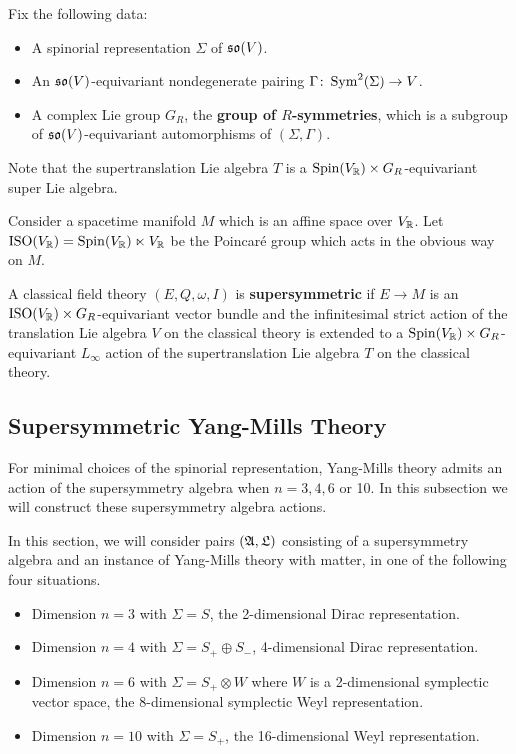 \documentclass[10pt, oneside]{article}
\begin{document}
Fix the following data:
\begin{itemize}
\item A spinorial representation $\Sigma$ of $\mathfrak{so}(V)$.

\item An $\mathfrak{so}(V)$-equivariant nondegenerate pairing $\Gamma\colon \operatorname{Sym}^2(\Sigma)\rightarrow V$.

\item A complex Lie group $G_R$, the {\bf group of $R$-symmetries}, which is a subgroup of $\mathfrak{so}(V)$-equivariant automorphisms of $(\Sigma, \Gamma)$.
\end{itemize}

Note that the supertranslation Lie algebra $T$ is a $\mathrm{Spin}(V_\mathbb R)\times G_R$-equivariant super Lie algebra.

Consider a spacetime manifold $M$ which is an affine space over $V_\mathbb R$. Let $\mathrm{ISO}(V_\mathbb R) = \mathrm{Spin}(V_\mathbb R)\ltimes V_\mathbb R$ be the Poincar\'{e} group which acts in the obvious way on $M$.

\begin{dfn}
A classical field theory $(E, Q, \omega, I)$ is {\bf supersymmetric} if $E\rightarrow M$ is an $\mathrm{ISO}(V_\mathbb R)\times G_R$-equivariant vector bundle and the infinitesimal strict action of the translation Lie algebra $V$ on the classical theory is extended to a $\mathrm{Spin}(V_\mathbb R)\times G_R$-equivariant $L_\infty$ action of the supertranslation Lie algebra $T$ on the classical theory.
\end{dfn}

\subsection{Supersymmetric Yang-Mills Theory} \label{SUSY_action_section}
For minimal choices of the spinorial representation, Yang-Mills theory admits an action of the supersymmetry algebra when $n=3,4,6$ or 10.  In this subsection we will construct these supersymmetry algebra actions.  

In this section, we will consider pairs $(\mathfrak{A}, \mathfrak L)$ consisting of a supersymmetry algebra and an instance of Yang-Mills theory with matter, in one of the following four situations.
\begin{itemize}
 \item Dimension $n=3$ with $\Sigma = S$, the 2-dimensional Dirac representation.
 \item Dimension $n=4$ with $\Sigma = S_+ \oplus S_-$, 4-dimensional Dirac representation.
 \item Dimension $n=6$ with $\Sigma = S_+ \otimes W$ where $W$ is a 2-dimensional symplectic vector space, the 8-dimensional symplectic Weyl representation.
 \item Dimension $n=10$ with $\Sigma = S_+$, the 16-dimensional Weyl representation.
\end{itemize}
\end{document}
